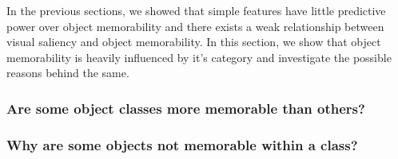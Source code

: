 In the previous sections, we showed that simple features have little predictive power over object memorability and there exists a weak relationship between visual saliency and object memorability. In this section, we show that object memorability is heavily influenced by it's category and investigate the possible reasons behind the same.

\subsubsection{Are some object classes more memorable than others?}



\subsubsection{Why are some objects not memorable within a class?}



